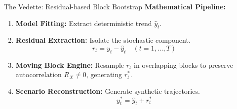\begin{frame}{The Vedette: Residual-based Block Bootstrap}
    \textbf{Mathematical Pipeline:}
    \vspace{0.3cm}

    \begin{enumerate}
        \item \textbf{Model Fitting:} Extract deterministic trend $\hat{y}_t$.
        \item \textbf{Residual Extraction:} Isolate the stochastic component.
        $$r_t = y_t - \hat{y}_t \quad (t = 1, \dots, T)$$
        \item \textbf{Moving Block Engine:} Resample $r_t$ in overlapping blocks to preserve autocorrelation $R_X \neq 0$, generating $r_t^*$.
        \item \textbf{Scenario Reconstruction:} Generate synthetic trajectories.
        $$y_t^* = \hat{y}_t + r_t^*$$
    \end{enumerate}
\end{frame}